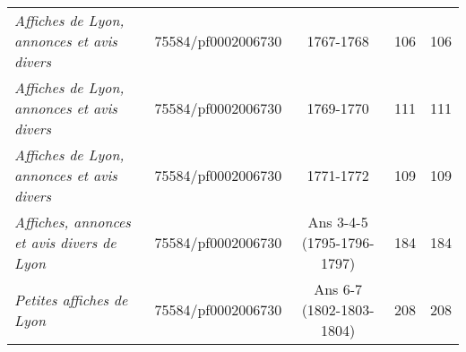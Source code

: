 \begin{table}[h]
{\begin{tabular}{lcccc}
			\textit{Affiches de Lyon, annonces et avis divers} & 75584/pf0002006730                            & 1767-1768                              & 106                                               & 106                                             \\ 
			\textit{Affiches de Lyon, annonces et avis divers} & 75584/pf0002006730                            & 1769-1770                              & 111                                               & 111                                             \\ 
			\textit{Affiches de Lyon, annonces et avis divers} & 75584/pf0002006730                            & 1771-1772                              & 109                                               & 109                                             \\ 
			\textit{Affiches, annonces et avis divers de Lyon} & 75584/pf0002006730                            & Ans 	3-4-5 (1795-1796-1797)            & 184                                               & 184                                             \\ 
			\textit{Petites affiches de Lyon}                  & 75584/pf0002006730                            & Ans 6-7 (1802-1803-1804)               & 208                                               & 208                                             \\ \hline
	\end{tabular}}
\end{table}


